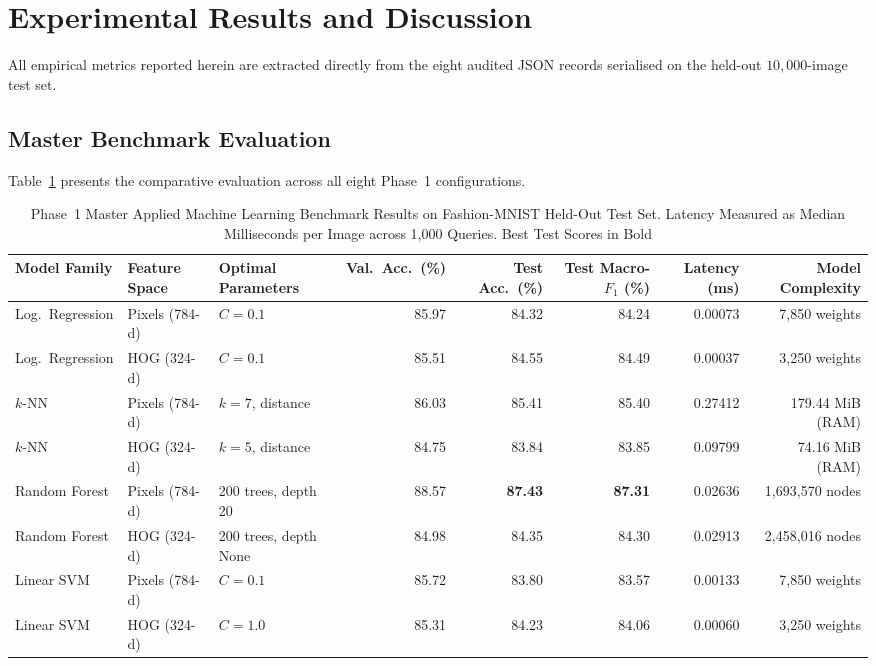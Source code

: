 \documentclass[conference]{IEEEtran}
\begin{document}
\section{Experimental Results and Discussion}
\label{sec:results}

All empirical metrics reported herein are extracted directly from the eight
audited JSON records serialised on the held-out $10{,}000$-image test set.

\subsection{Master Benchmark Evaluation}
Table~\ref{tab:results} presents the comparative evaluation across all
eight Phase~1 configurations.

\begin{table}[!t]
\centering
\caption{Phase~1 Master Applied Machine Learning Benchmark Results on
Fashion-MNIST Held-Out Test Set. Latency Measured as Median Milliseconds
per Image across 1{,}000 Queries. Best Test Scores in Bold}
\label{tab:results}
\footnotesize
\setlength{\tabcolsep}{4pt}
\begin{tabular}{lllrrrrr}
\toprule
Model Family & Feature Space & Optimal Parameters & Val.\ Acc.\ (\%) & Test Acc.\ (\%) & Test Macro-$F_1$ (\%) & Latency (ms) & Model Complexity\\
\midrule
Log.\ Regression & Pixels (784-d) & $C=0.1$ & 85.97 & 84.32 & 84.24 & 0.00073 & 7,850 weights\\
Log.\ Regression & HOG (324-d)    & $C=0.1$ & 85.51 & 84.55 & 84.49 & 0.00037 & 3,250 weights\\
$k$-NN           & Pixels (784-d) & $k=7$, distance & 86.03 & 85.41 & 85.40 & 0.27412 & 179.44 MiB (RAM)\\
$k$-NN           & HOG (324-d)    & $k=5$, distance & 84.75 & 83.84 & 83.85 & 0.09799 & 74.16 MiB (RAM)\\
Random Forest    & Pixels (784-d) & 200 trees, depth 20 & 88.57 & \textbf{87.43} & \textbf{87.31} & 0.02636 & 1,693,570 nodes\\
Random Forest    & HOG (324-d)    & 200 trees, depth None & 84.98 & 84.35 & 84.30 & 0.02913 & 2,458,016 nodes\\
Linear SVM       & Pixels (784-d) & $C=0.1$ & 85.72 & 83.80 & 83.57 & 0.00133 & 7,850 weights\\
Linear SVM       & HOG (324-d)    & $C=1.0$ & 85.31 & 84.23 & 84.06 & 0.00060 & 3,250 weights\\
\bottomrule
\end{tabular}
\end{table}
\end{document}
